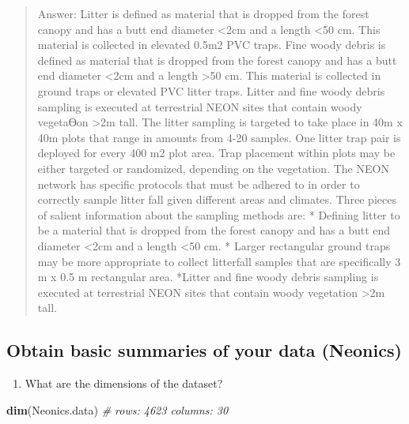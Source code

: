 \documentclass[]{article}
\newenvironment{Shaded}{\begin{snugshade}}{\end{snugshade}}
\newcommand{\CommentTok}[1]{\textcolor[rgb]{0.56,0.35,0.01}{\textit{#1}}}
\newcommand{\KeywordTok}[1]{\textcolor[rgb]{0.13,0.29,0.53}{\textbf{#1}}}
\newcommand{\NormalTok}[1]{#1}
\providecommand{\tightlist}{%
  \setlength{\itemsep}{0pt}\setlength{\parskip}{0pt}}
\begin{document}
\begin{quote}
Answer: Litter is defined as material that is dropped from the forest
canopy and has a butt end diameter \textless{}2cm and a length
\textless{}50 cm. This material is collected in elevated 0.5m2 PVC
traps. Fine woody debris is defined as material that is dropped from the
forest canopy and has a butt end diameter \textless{}2cm and a length
\textgreater{}50 cm. This material is collected in ground traps or
elevated PVC litter traps. Litter and fine woody debris sampling is
executed at terrestrial NEON sites that contain woody vegetaƟon
\textgreater{}2m tall. The litter sampling is targeted to take place in
40m x 40m plots that range in amounts from 4-20 samples. One litter trap
pair is deployed for every 400 m2 plot area. Trap placement within plots
may be either targeted or randomized, depending on the vegetation. The
NEON network has specific protocols that must be adhered to in order to
correctly sample litter fall given different areas and climates. Three
pieces of salient information about the sampling methods are: * Defining
litter to be a material that is dropped from the forest canopy and has a
butt end diameter \textless{}2cm and a length \textless{}50 cm. * Larger
rectangular ground traps may be more appropriate to collect litterfall
samples that are specifically 3 m x 0.5 m rectangular area. *Litter and
fine woody debris sampling is executed at terrestrial NEON sites that
contain woody vegetation \textgreater{}2m tall.
\end{quote}

\hypertarget{obtain-basic-summaries-of-your-data-neonics}{%
\subsection{Obtain basic summaries of your data
(Neonics)}\label{obtain-basic-summaries-of-your-data-neonics}}

\begin{enumerate}
\def\labelenumi{\arabic{enumi}.}
\setcounter{enumi}{4}
\tightlist
\item
  What are the dimensions of the dataset?
\end{enumerate}

\begin{Shaded}
\begin{Highlighting}[]
\KeywordTok{dim}\NormalTok{(Neonics.data) }\CommentTok{# rows: 4623 columns: 30}
\end{Highlighting}
\end{Shaded}
\end{document}
